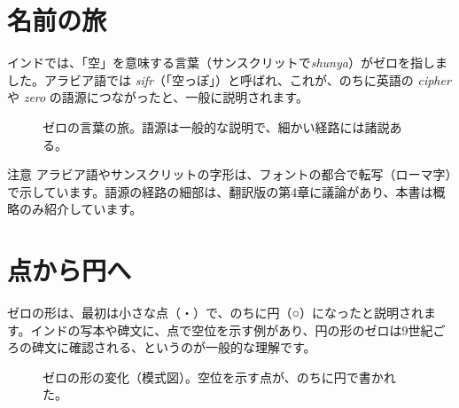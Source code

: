 \documentclass[a4paper,11pt,openany]{ltjsbook}
\begin{document}
\section{名前の旅}

インドでは、「空」を意味する言葉（サンスクリットで\textit{shunya}）がゼロを指しました。アラビア語では \textit{sifr}（「空っぽ」）と呼ばれ、これが、のちに英語の \textit{cipher} や \textit{zero} の語源につながったと、一般に説明されます。

\begin{figure}[htbp]
\centering
{}
\caption{ゼロの言葉の旅。語源は一般的な説明で、細かい経路には諸説ある。}
\end{figure}

\begin{notebox}{注意}
アラビア語やサンスクリットの字形は、フォントの都合で転写（ローマ字）で示しています。語源の経路の細部は、翻訳版の第4章に議論があり、本書は概略のみ紹介しています。
\end{notebox}

\section{点から円へ}

ゼロの形は、最初は小さな点（・）で、のちに円（○）になったと説明されます。インドの写本や碑文に、点で空位を示す例があり、円の形のゼロは9世紀ごろの碑文に確認される、というのが一般的な理解です。

\begin{figure}[htbp]
\centering
{}
\caption{ゼロの形の変化（模式図）。空位を示す点が、のちに円で書かれた。}
\end{figure}
\end{document}

